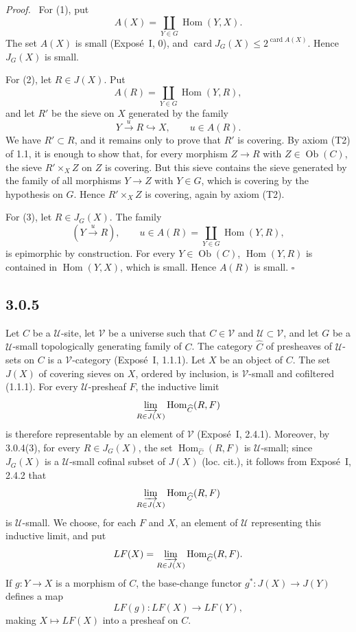 \documentclass[11pt]{article}
\newcommand{\U}{\mathcal{U}}
\newcommand{\V}{\mathcal{V}}
\newcommand{\Hom}{\operatorname{Hom}}
\newcommand{\Ob}{\operatorname{Ob}}
\newcommand{\qedtext}{\hfill\(\square\)}
\newenvironment{prooftext}{\par\noindent\emph{Proof.}\ }{\par\medskip}
\begin{document}
\begin{prooftext}
For (1), put
\[
A(X)=\coprod_{Y\in G}\Hom(Y,X).
\]
The set \(A(X)\) is small (Expos\'e~I, 0), and \(\operatorname{card} J_G(X)\le 2^{\operatorname{card} A(X)}\). Hence \(J_G(X)\) is small.

For (2), let \(R\in J(X)\). Put
\[
A(R)=\coprod_{Y\in G}\Hom(Y,R),
\]
and let \(R'\) be the sieve on \(X\) generated by the family
\[
Y\xrightarrow{u}R\hookrightarrow X,\qquad u\in A(R).
\]
We have \(R'\subset R\), and it remains only to prove that \(R'\) is covering. By axiom (T2) of 1.1, it is enough to show that, for every morphism \(Z\to R\) with \(Z\in\Ob(C)\), the sieve \(R'\times_X Z\) on \(Z\) is covering. But this sieve contains the sieve generated by the family of all morphisms \(Y\to Z\) with \(Y\in G\), which is covering by the hypothesis on \(G\). Hence \(R'\times_XZ\) is covering, again by axiom (T2).

For (3), let \(R\in J_G(X)\). The family
\[
(Y\xrightarrow{u}R),\qquad u\in A(R)=\coprod_{Y\in G}\Hom(Y,R),
\]
is epimorphic by construction. For every \(Y\in\Ob(C)\), \(\Hom(Y,R)\) is contained in \(\Hom(Y,X)\), which is small. Hence \(A(R)\) is small. \qedtext
\end{prooftext}

\subsection*{3.0.5}
Let \(C\) be a \(\U\)-site, let \(\V\) be a universe such that \(C\in\V\) and \(\U\subset \V\), and let \(G\) be a \(\U\)-small topologically generating family of \(C\). The category \(\widehat C\) of presheaves of \(\U\)-sets on \(C\) is a \(\V\)-category (Expos\'e~I, 1.1.1). Let \(X\) be an object of \(C\). The set \(J(X)\) of covering sieves on \(X\), ordered by inclusion, is \(\V\)-small and cofiltered (1.1.1). For every \(\U\)-presheaf \(F\), the inductive limit
\[
\varinjlim_{R\in J(X)} \Hom_{\widehat C}(R,F)
\]
is therefore representable by an element of \(\V\) (Expos\'e~I, 2.4.1). Moreover, by 3.0.4(3), for every \(R\in J_G(X)\), the set \(\Hom_{\widehat C}(R,F)\) is \(\U\)-small; since \(J_G(X)\) is a \(\U\)-small cofinal subset of \(J(X)\) (loc. cit.), it follows from Expos\'e~I, 2.4.2 that
\[
\varinjlim_{R\in J(X)} \Hom_{\widehat C}(R,F)
\]
is \(\U\)-small. We choose, for each \(F\) and \(X\), an element of \(\U\) representing this inductive limit, and put
\[
LF(X)=\varinjlim_{R\in J(X)}\Hom_{\widehat C}(R,F).
\]
If \(g:Y\to X\) is a morphism of \(C\), the base-change functor \(g^\ast:J(X)\to J(Y)\) defines a map
\[
LF(g):LF(X)\longrightarrow LF(Y),
\]
making \(X\mapsto LF(X)\) into a presheaf on \(C\).
\end{document}
